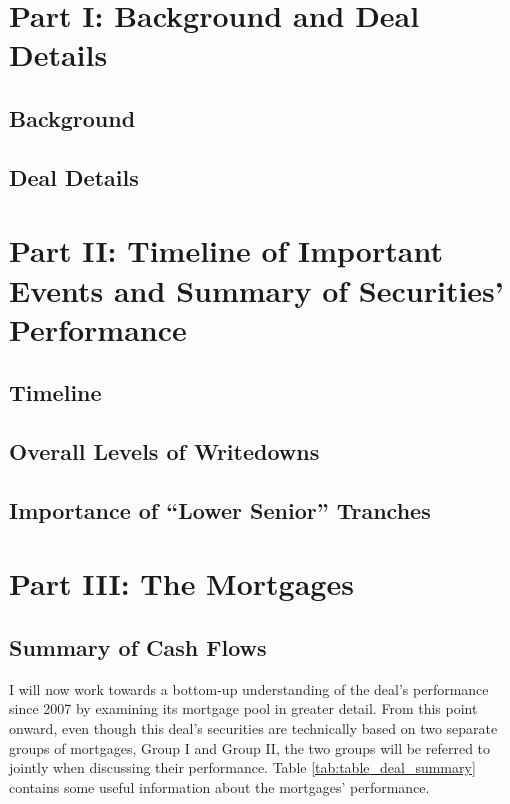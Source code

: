 \documentclass[12pt]{article}
\begin{document}
\section*{Part I: Background and Deal Details}
\subsection*{Background}

\subsection*{Deal Details}

\section*{Part II: Timeline of Important Events and Summary of Securities' Performance}

\subsection*{Timeline}


\subsection*{Overall Levels of Writedowns}


\subsection*{Importance of ``Lower Senior'' Tranches}



\section*{Part III: The Mortgages}
\subsection*{Summary of Cash Flows}

I will now work towards a bottom-up understanding of the deal's performance since 2007 by examining its mortgage pool in greater detail. From this point onward, even though this deal’s securities are technically based on two separate groups of mortgages, Group I and Group II, the two groups will be referred to jointly when discussing their performance. Table \ref{tab:table_deal_summary} contains some useful information about the mortgages’ performance.
\end{document}
